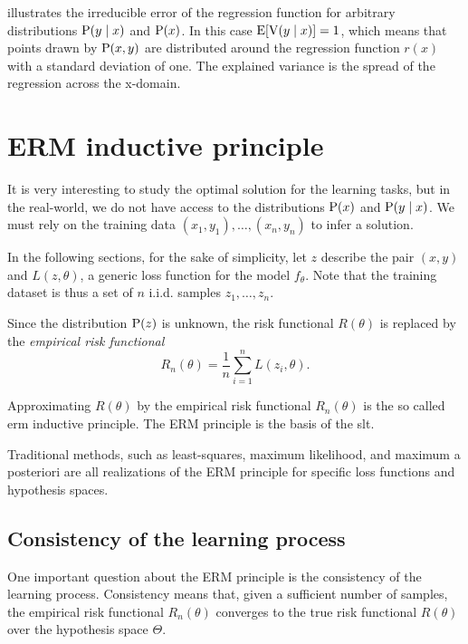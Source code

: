  illustrates the irreducible error of the
regression function for arbitrary distributions $\operatorname{P}(y \mid x)$ and $\operatorname{P}(x)$.
In this case $\operatorname{E}\!\left[ \operatorname{V}(y \mid x) \right] = 1$, which means that points drawn
by $\operatorname{P}(x, y)$ are distributed around the regression function $r(x)$ with a standard
deviation of one.  The explained variance is the spread of the regression across the
x-domain.

\section{ERM inductive principle}

It is very interesting to study the optimal solution for the learning tasks, but in the
real-world, we do not have access to the distributions $\operatorname{P}(x)$ and $\operatorname{P}(y \mid x)$.
We must rely on the training data $(x_1, y_1), \dots, (x_n, y_n)$ to infer a solution.

In the following sections, for the sake of simplicity, let $z$ describe the pair $(x, y)$
and $L(z, \theta)$, a generic loss function for the model $f_\theta$.  Note that the
training dataset is thus a set of $n$ i.i.d. samples $z_1, \dots, z_n$.

Since the distribution $\operatorname{P}(z)$ is unknown, the risk functional $R(\theta)$ is replaced by
the \emph{empirical risk functional}
\begin{equation}
  \label{eq:empirical-risk}
  R_n(\theta) = \frac{1}{n} \sum_{i=1}^n L(z_i, \theta)\text{.}
\end{equation}

Approximating $R(\theta)$ by the empirical risk functional $R_n(\theta)$ is the so called
\gls{erm} inductive principle.  The ERM principle is the basis of the \gls{slt}.

Traditional methods, such as least-squares, maximum likelihood, and maximum a posteriori are
all realizations of the ERM principle for specific loss functions and hypothesis spaces.

\subsection{Consistency of the learning process}

One important question about the ERM principle is the consistency of the learning process.
Consistency means that, given a sufficient number of samples, the empirical risk
functional $R_n(\theta)$ converges to the true risk functional $R(\theta)$ over the
hypothesis space $\Theta$.

